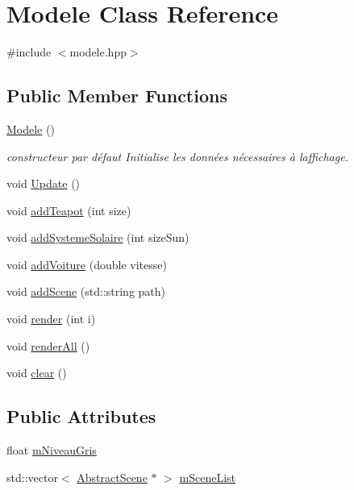 \hypertarget{class_modele}{}\section{Modele Class Reference}
\label{class_modele}


{\ttfamily \#include $<$modele.\+hpp$>$}

\subsection*{Public Member Functions}
\begin{DoxyCompactItemize}
\item 
\hyperlink{class_modele_ae9d6a289deaebe7e8eeda46693d79d23}{Modele} ()
\begin{DoxyCompactList}\small\item\em constructeur par défaut Initialise les données nécessaires à l\textquotesingle{}affichage. \end{DoxyCompactList}\item 
void \hyperlink{class_modele_a4e09a90f4eac78fa17d362fe4ff23b2f}{Update} ()
\item 
void \hyperlink{class_modele_a3a5fdb6f258abb35347ba0610eef5ff2}{add\+Teapot} (int size)
\item 
void \hyperlink{class_modele_a01924068a9a20616cdfe667caaa0e0e5}{add\+Systeme\+Solaire} (int size\+Sun)
\item 
void \hyperlink{class_modele_a9f572a21d86fa69563b9020ddcf7eef9}{add\+Voiture} (double vitesse)
\item 
void \hyperlink{class_modele_a2b9ce0869e6965e9247eaa91587d37b7}{add\+Scene} (std\+::string path)
\item 
void \hyperlink{class_modele_a8c611c3edf341892ceefebd9c3e00136}{render} (int i)
\item 
void \hyperlink{class_modele_a78714b95cdb2f63e76c9e122f41e6bbd}{render\+All} ()
\item 
void \hyperlink{class_modele_a1f02ee40382488479be64890e53ea348}{clear} ()
\end{DoxyCompactItemize}
\subsection*{Public Attributes}
\begin{DoxyCompactItemize}
\item 
float \hyperlink{class_modele_a3ab26b711a9452193a341479b3294464}{m\+Niveau\+Gris}
\item 
std\+::vector$<$ \hyperlink{class_abstract_scene}{Abstract\+Scene} $\ast$ $>$ \hyperlink{class_modele_a5b1fde589f17e1f6a87c00022ae2821e}{m\+Scene\+List}
\end{DoxyCompactItemize}


